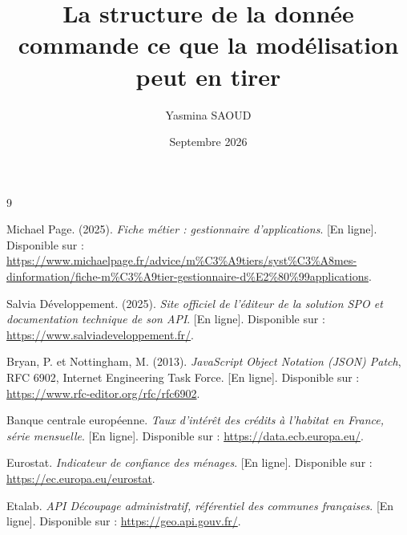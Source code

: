 \documentclass[12pt, french]{report}
\title{\Huge{La structure de la donnée commande ce que la modélisation peut en tirer}}
\author{Yasmina SAOUD}
\date{Septembre 2026}
\begin{document}
\dominitoc
{}



\clearpage
\tableofcontents
\clearpage
{}

\clearpage
{}
\listoffigures

\clearpage
{}










\begin{thebibliography}{9}

Michael Page. (2025). \textit{Fiche métier : gestionnaire d'applications}. [En ligne]. Disponible sur : \url{https://www.michaelpage.fr/advice/m%C3%A9tiers/syst%C3%A8mes-dinformation/fiche-m%C3%A9tier-gestionnaire-d%E2%80%99applications}.

Salvia Développement. (2025). \textit{Site officiel de l'éditeur de la solution SPO et documentation technique de son API}. [En ligne]. Disponible sur : \url{https://www.salviadeveloppement.fr/}.

Bryan, P. et Nottingham, M. (2013). \textit{JavaScript Object Notation (JSON) Patch}, RFC 6902, Internet Engineering Task Force. [En ligne]. Disponible sur : \url{https://www.rfc-editor.org/rfc/rfc6902}.

Banque centrale européenne. \textit{Taux d'intérêt des crédits à l'habitat en France, série mensuelle}. [En ligne]. Disponible sur : \url{https://data.ecb.europa.eu/}.

Eurostat. \textit{Indicateur de confiance des ménages}. [En ligne]. Disponible sur : \url{https://ec.europa.eu/eurostat}.

Etalab. \textit{API Découpage administratif, référentiel des communes françaises}. [En ligne]. Disponible sur : \url{https://geo.api.gouv.fr/}.

\end{thebibliography}
\end{document}
